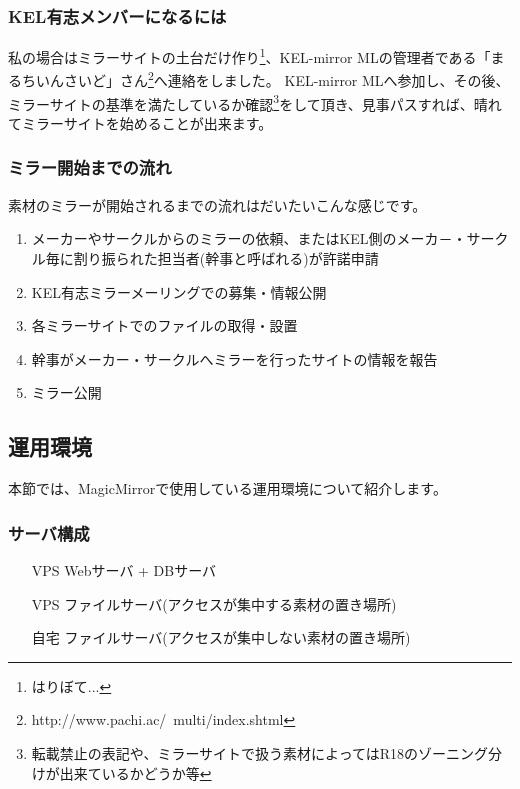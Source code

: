 \subsubsection{KEL有志メンバーになるには}

私の場合はミラーサイトの土台だけ作り\footnote{はりぼて...}、KEL-mirror MLの管理者である「まるちいんさいど」さん\footnote{http://www.pachi.ac/~multi/index.shtml}へ連絡をしました。%
KEL-mirror MLへ参加し、その後、ミラーサイトの基準を満たしているか確認\footnote{転載禁止の表記や、ミラーサイトで扱う素材によってはR18のゾーニング分けが出来ているかどうか等}をして頂き、見事パスすれば、晴れてミラーサイトを始めることが出来ます。

\subsubsection{ミラー開始までの流れ}

素材のミラーが開始されるまでの流れはだいたいこんな感じです。\cite{XES}
\begin{enumerate}
 \item メーカーやサークルからのミラーの依頼、またはKEL側のメーカ－・サークル毎に割り振られた担当者(幹事と呼ばれる)が許諾申請
 \item KEL有志ミラーメーリングでの募集・情報公開
 \item 各ミラーサイトでのファイルの取得・設置
 \item 幹事がメーカー・サークルへミラーを行ったサイトの情報を報告
 \item ミラー公開
\end{enumerate}


\subsection{運用環境}
本節では、MagicMirrorで使用している運用環境について紹介します。

\subsubsection{サーバ構成}

\begin{itemize}
 \item [VPS] Webサーバ + DBサーバ 
 \item [VPS] ファイルサーバ(アクセスが集中する素材の置き場所)
 \item [自宅] ファイルサーバ(アクセスが集中しない素材の置き場所)
\end{itemize}

